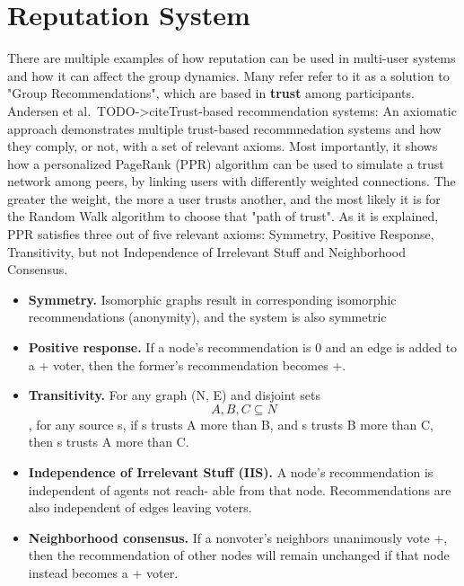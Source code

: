 \section{Reputation System}\label{sec:rep-sys-sota}

There are multiple examples of how reputation can be used in multi-user systems and how it can affect the group dynamics. Many refer refer to it as a solution to "Group Recommendations", which are based in \textbf{trust} among participants. Andersen et al.\ TODO->cite{Trust-based recommendation systems: An axiomatic approach} demonstrates multiple trust-based recommnedation systems and how they comply, or not, with a set of relevant axioms. Most importantly, it shows how a personalized PageRank (PPR) algorithm can be used to simulate a trust network among peers, by linking users with differently weighted connections. The greater the weight, the more a user trusts another, and the most likely it is for the Random Walk algorithm to choose that "path of trust". As it is explained, PPR satisfies three out of five relevant axioms: Symmetry, Positive Response, Transitivity, but not Independence of Irrelevant Stuff and Neighborhood Consensus.
\begin{itemize}
    \item \textbf{Symmetry.} Isomorphic graphs result in corresponding isomorphic recommendations (anonymity), and the system is also symmetric
    \item \textbf{Positive response.} If a node’s recommendation is 0 and an edge is added to a + voter, then the former’s recommendation becomes +.
    \item \textbf{Transitivity.} For any graph (N, E) and disjoint sets $$ A, B, C \subseteq N $$ , for any source s, if s trusts A more than B, and s trusts B more than C, then s trusts A more than C.
    \item \textbf{Independence of Irrelevant Stuﬀ (IIS).} A node’s recommendation is independent of agents not reach- able from that node. Recommendations are also independent of edges leaving voters.
    \item \textbf{Neighborhood consensus.} If a nonvoter’s neighbors unanimously vote +, then the recommendation of other nodes will remain unchanged if that node instead becomes a + voter.
\end{itemize}


